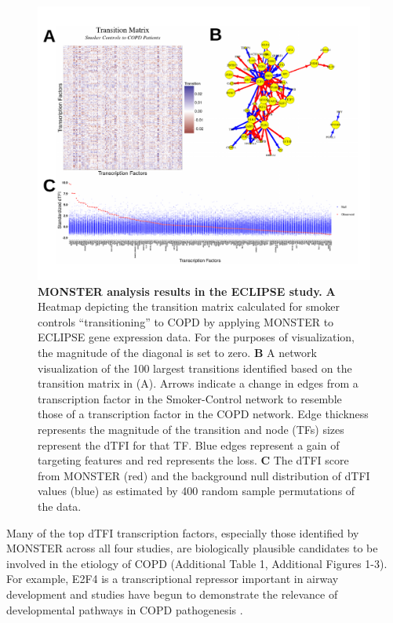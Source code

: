 \begin{figure}%
\centering
\includegraphics[width=1\linewidth]{figures/figure2_labeled}
\caption{\textbf{MONSTER analysis results in the ECLIPSE study.} \textbf{A} Heatmap depicting the transition matrix calculated for smoker controls ``transitioning'' to COPD  by applying MONSTER to ECLIPSE gene expression data. For the purposes of visualization, the magnitude of the diagonal is set to zero. \textbf{B} A network visualization of the 100 largest transitions identified based on the transition matrix  in (A). Arrows indicate a change in edges from a transcription factor in the Smoker-Control network to resemble those of a transcription factor in the COPD network. Edge thickness represents the magnitude of the transition and node (TFs) sizes represent the dTFI for that TF. Blue edges represent a gain of targeting features and red represents the loss. \textbf{C} The dTFI score from MONSTER (red) and the background null distribution of dTFI values (blue) as estimated by 400 random sample permutations of the data.}
\label{fig:ECLIPSE_results}
\end{figure}

Many of the top dTFI transcription factors, especially those identified by MONSTER across all four studies, are biologically plausible candidates to be involved in the etiology of COPD (Additional Table 1, Additional Figures 1-3). For example, E2F4 is a transcriptional repressor important in airway development \cite{danielian2007e2f4} and studies have begun to demonstrate the relevance of developmental pathways in COPD pathogenesis \cite{boucherat2016bridging}.

